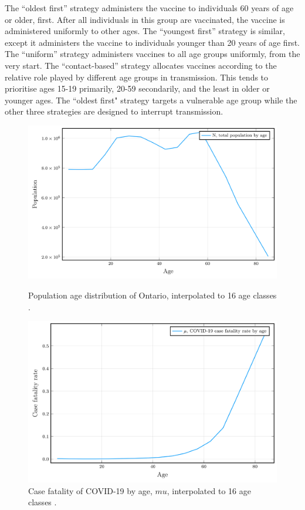 The “oldest first” strategy administers the vaccine to individuals 60 years of age or older, first.  After all individuals in this group are vaccinated, the vaccine is administered uniformly to other ages. The “youngest first” strategy is similar, except it administers the vaccine to individuals younger than 20 years of age first.  The “uniform” strategy administers vaccines to all age groups uniformly, from the very start. The “contact-based” strategy allocates vaccines according to the relative role played by different age groups in transmission. This tends to prioritise ages 15-19 primarily, 20-59 secondarily, and the least in older or younger ages.  The ``oldest first" strategy targets a vulnerable age group while the other three strategies are designed to interrupt transmission.
\begin{figure}
  \begin{minipage}{.45\textwidth}
    \includegraphics[width=\linewidth]{chapter_1/n_plot.png}
    \caption{Population age distribution of Ontario, interpolated to 16 age classes \cite{ontario_census}.}
    \label{n_figure}
  \end{minipage}
  \begin{minipage}{.45\textwidth}
      \includegraphics[width=\linewidth]{chapter_1/mu_plot.png}
      \caption{Case fatality of COVID-19 by age, $mu$, interpolated to 16 age classes \cite{publichealthontario}.}
     \label{mu_figure}
  \end{minipage}\hfill


\end{figure}
  
